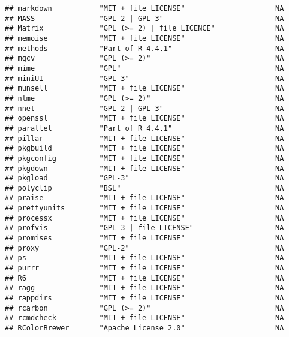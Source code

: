 \documentclass[
]{article}
\begin{document}
\begin{verbatim}
## markdown           "MIT + file LICENSE"                     NA             
## MASS               "GPL-2 | GPL-3"                          NA             
## Matrix             "GPL (>= 2) | file LICENCE"              NA             
## memoise            "MIT + file LICENSE"                     NA             
## methods            "Part of R 4.4.1"                        NA             
## mgcv               "GPL (>= 2)"                             NA             
## mime               "GPL"                                    NA             
## miniUI             "GPL-3"                                  NA             
## munsell            "MIT + file LICENSE"                     NA             
## nlme               "GPL (>= 2)"                             NA             
## nnet               "GPL-2 | GPL-3"                          NA             
## openssl            "MIT + file LICENSE"                     NA             
## parallel           "Part of R 4.4.1"                        NA             
## pillar             "MIT + file LICENSE"                     NA             
## pkgbuild           "MIT + file LICENSE"                     NA             
## pkgconfig          "MIT + file LICENSE"                     NA             
## pkgdown            "MIT + file LICENSE"                     NA             
## pkgload            "GPL-3"                                  NA             
## polyclip           "BSL"                                    NA             
## praise             "MIT + file LICENSE"                     NA             
## prettyunits        "MIT + file LICENSE"                     NA             
## processx           "MIT + file LICENSE"                     NA             
## profvis            "GPL-3 | file LICENSE"                   NA             
## promises           "MIT + file LICENSE"                     NA             
## proxy              "GPL-2"                                  NA             
## ps                 "MIT + file LICENSE"                     NA             
## purrr              "MIT + file LICENSE"                     NA             
## R6                 "MIT + file LICENSE"                     NA             
## ragg               "MIT + file LICENSE"                     NA             
## rappdirs           "MIT + file LICENSE"                     NA             
## rcarbon            "GPL (>= 2)"                             NA             
## rcmdcheck          "MIT + file LICENSE"                     NA             
## RColorBrewer       "Apache License 2.0"                     NA             

\end{verbatim}
\end{document}
